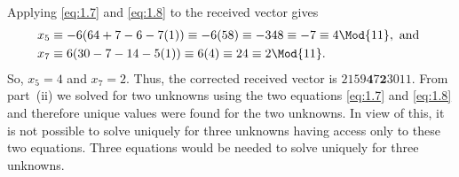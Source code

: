 Applying \eqref{eq:1.7} and \eqref{eq:1.8} to the received vector gives
\begin{align*}
	x_5 &\equiv -6(64+7-6 -7(1)) \equiv -6(58) \equiv -348 \equiv -7 \equiv 4 \Mod{11},\textrm{ and }\\
	x_7 &\equiv 6(30-7 -14 -5(1)) \equiv 6(4) \equiv 24 \equiv 2 \Mod{11}.
\end{align*}
So, $x_5=4$ and $x_7=2$.  Thus, the corrected received vector is $2159\textbf{4}7\textbf{2}3011$.
\qsubpart
From part~(ii) we solved for two unknowns using the two equations \eqref{eq:1.7} and \eqref{eq:1.8} and therefore unique values were found for the two unknowns.  In view of this, it is not possible to solve uniquely for three unknowns having access only to these two equations.  Three equations would be needed to solve uniquely for three unknowns. 
